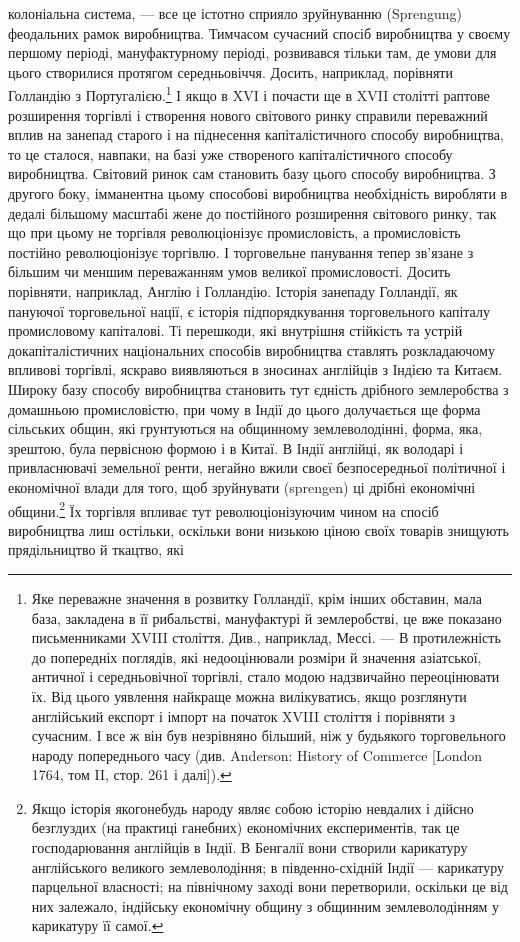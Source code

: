 \parcont{}  %
колоніальна система, — все це істотно сприяло зруйнуванню
(Sprengung) феодальних рамок виробництва. Тимчасом сучасний
спосіб виробництва у своєму першому періоді, мануфактурному
періоді, розвивався тільки там, де умови для цього створилися
протягом середньовіччя. Досить, наприклад, порівняти Голландію
з Португалією.\footnote{
Яке переважне значення в розвитку Голландії, крім інших обставин,
мала база, закладена в її рибальстві, мануфактурі й землеробстві, це вже показано
письменниками XVIII століття. Див., наприклад, Мессі. — В протилежність
до попередніх поглядів, які недооцінювали розміри й значення азіатської, античної
і середньовічної торгівлі, стало модою надзвичайно переоцінювати їх.
Від цього уявлення найкраще можна вилікуватись, якщо розглянути англійський
експорт і імпорт на початок XVIII століття і порівняти з сучасним. І все ж
він був незрівняно більший, ніж у будьякого торговельного народу попереднього
часу (див. Anderson: History of Commerce [London 1764, том II, стор. 261
і далі]).
} І якщо в XVI і почасти ще в XVII столітті
раптове розширення торгівлі і створення нового світового ринку
справили переважний вплив на занепад старого і на піднесення
капіталістичного способу виробництва, то це сталося, навпаки,
на базі уже створеного капіталістичного способу виробництва.
Світовий ринок сам становить базу цього способу виробництва.
З другого боку, імманентна цьому способові виробництва необхідність
виробляти в дедалі більшому масштабі жене до постійного
розширення світового ринку, так що при цьому не торгівля
революціонізує промисловість, а промисловість постійно революціонізує
торгівлю. І торговельне панування тепер зв’язане
з більшим чи меншим переважанням умов великої промисловості.
Досить порівняти, наприклад, Англію і Голландію. Історія занепаду
Голландії, як пануючої торговельної нації, є історія підпорядкування
торговельного капіталу промисловому капіталові.
Ті перешкоди, які внутрішня стійкість та устрій докапіталістичних
національних способів виробництва ставлять розкладаючому
впливові торгівлі, яскраво виявляються в зносинах англійців
з Індією та Китаєм. Широку базу способу виробництва
становить тут єдність дрібного землеробства з домашньою промисловістю,
при чому в Індії до цього долучається ще форма
сільських общин, які грунтуються на общинному землеволодінні,
форма, яка, зрештою, була первісною формою і в Китаї.
В Індії англійці, як володарі і привласнювачі земельної ренти,
негайно вжили своєї безпосередньої політичної і економічної
влади для того, щоб зруйнувати (sprengen) ці дрібні економічні
общини.\footnote{
Якщо історія якогонебудь народу являє собою історію невдалих і дійсно
безглуздих (на практиці ганебних) економічних експериментів, так це господарювання
англійців в Індії. В Бенгалії вони створили карикатуру англійського
великого землеволодіння; в південно-східній Індії — карикатуру парцельної
власності; на північному заході вони перетворили, оскільки це від них залежало,
індійську економічну общину з общинним землеволодінням у карикатуру її
самої.
} Їх торгівля впливає тут революціонізуючим чином
на спосіб виробництва лиш остільки, оскільки вони низькою
ціною своїх товарів знищують прядільництво й ткацтво, які
\parbreak{}  %
